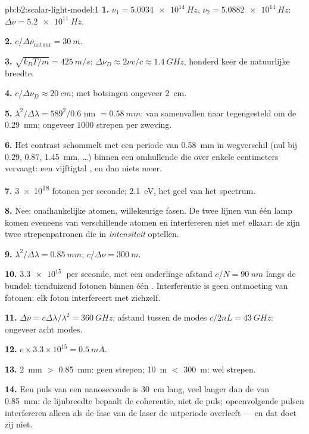 \begin{solution}{pb:b2:scalar-light-model:1}
\textbf{1.} $\nu_1 = \qty{5.0934e14}{Hz}$, $\nu_2 = \qty{5.0882e14}{Hz}$:
$\Delta\nu = \qty{5.2e11}{Hz}$.

\textbf{2.} $c/\Delta\nu_{\text{natuur}} = \qty{30}{m}$.

\textbf{3.} $\sqrt{k_BT/m} = \qty{425}{m/s}$:
$\Delta\nu_D \approx 2\nu v/c \approx \qty{1.4}{GHz}$, honderd keer de
natuurlijke breedte.

\textbf{4.} $c/\Delta\nu_D \approx \qty{20}{cm}$; met botsingen ongeveer
\qty{2}{cm}.

\textbf{5.} $\lambda^2/\Delta\lambda = 589^2/0.6$ nm $= \qty{0.58}{mm}$: van
samenvallen naar tegengesteld om de \qty{0.29}{mm}; ongeveer $1000$ strepen
per zweving.

\textbf{6.} Het contrast schommelt met een periode van \qty{0.58}{mm} in
wegverschil (nul bij $0.29$, $0.87$, \qty{1.45}{mm}, \dots) binnen een
omhullende die over enkele centimeters vervaagt: een vijftigtal ,
en dan niets meer.

\textbf{7.} \qty{3e18}{} fotonen per seconde; \qty{2.1}{eV}, het geel van
het spectrum.

\textbf{8.} Nee: onafhankelijke atomen, willekeurige fasen. De twee lijnen
van één lamp komen eveneens van verschillende atomen en interfereren niet
met elkaar: de  zijn twee strepenpatronen die in \emph{intensiteit}
optellen.

\textbf{9.} $\lambda^2/\Delta\lambda = \qty{0.85}{mm}$;
$c/\Delta\nu = \qty{300}{m}$.

\textbf{10.} $\qty{3.3e15}{}$ per seconde, met een onderlinge afstand
$c/N = \qty{90}{nm}$ langs de bundel: tienduizend fotonen binnen één
. Interferentie is geen ontmoeting van fotonen: elk foton
interfereert met zichzelf.

\textbf{11.} $\Delta\nu = c\Delta\lambda/\lambda^2 = \qty{360}{GHz}$;
afstand tussen de modes $c/2nL = \qty{43}{GHz}$: ongeveer acht modes.

\textbf{12.} $e \times 3.3 \times 10^{15} = \qty{0.5}{mA}$.

\textbf{13.} \qty{2}{mm} $>$ \qty{0.85}{mm}: geen strepen; \qty{10}{m} $<$
\qty{300}{m}: wel strepen.

\textbf{14.} Een puls van een nanoseconde is \qty{30}{cm} lang, veel langer
dan de  van \qty{0.85}{mm}: de lijnbreedte bepaalt de
coherentie, niet de puls; opeenvolgende pulsen interfereren alleen als de
fase van de laser de uitperiode overleeft --- en dat doet zij niet.


\end{solution}
